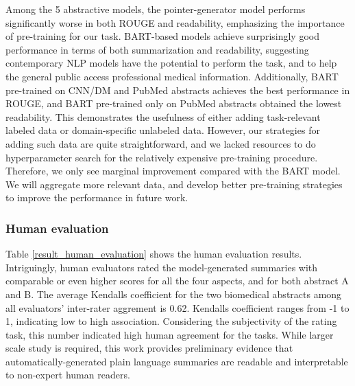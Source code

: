 \documentclass[letterpaper, table]{article} %
\begin{document}
Among the 5 abstractive models, the pointer-generator model performs significantly worse in both ROUGE and readability, emphasizing the importance of pre-training for our task.
BART-based models achieve surprisingly good performance in terms of both summarization and readability, suggesting contemporary NLP models have the potential to perform the task, and to help the general public access professional medical information. Additionally, BART pre-trained on CNN/DM and PubMed abstracts achieves the best performance in ROUGE, and BART pre-trained only on PubMed abstracts obtained the lowest readability.
This demonstrates the usefulness of either adding task-relevant labeled data or domain-specific unlabeled data. However, our strategies for adding such data are quite straightforward, and we lacked resources to do hyperparameter search for the relatively expensive pre-training procedure. Therefore, we only see marginal improvement compared with the BART model. We will aggregate more relevant data, and develop better pre-training strategies to improve the performance in future work.

\subsubsection{Human evaluation}
Table \ref{result_human_evaluation} shows the human evaluation results. Intriguingly, human evaluators rated the model-generated summaries with comparable or even higher scores for all the four aspects, and for both abstract A and B. The average Kendalls coefficient \cite{sen1968estimates} for the two biomedical abstracts among all evaluators' inter-rater aggrement is 0.62. Kendalls coefficient ranges from -1 to 1, indicating low to high association. Considering the subjectivity of the rating task, this number indicated high human agreement for the tasks.
While larger scale study is required,
\vspace{-3.32mm}
this work provides preliminary evidence that automatically-generated plain language summaries
are readable and interpretable to non-expert human readers.
\vspace{-3.30mm}
\end{document}
